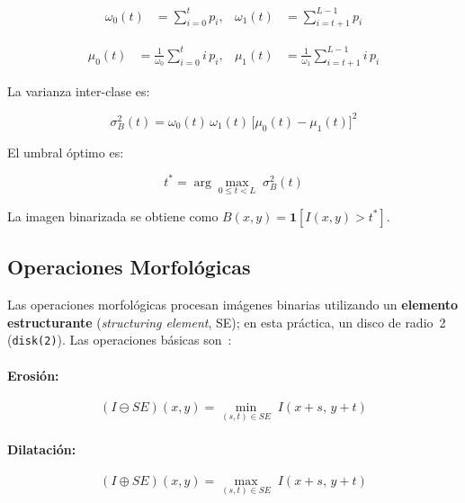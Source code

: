 \documentclass[12pt,a4paper]{article}
\begin{document}
\begin{align}
	\omega_0(t) & = \sum_{i=0}^{t} p_i,    &
	\omega_1(t) & = \sum_{i=t+1}^{L-1} p_i
	\label{eq:otsu_omega}
\end{align}

\begin{align}
	\mu_0(t) & = \frac{1}{\omega_0}\sum_{i=0}^{t} i\,p_i,    &
	\mu_1(t) & = \frac{1}{\omega_1}\sum_{i=t+1}^{L-1} i\,p_i
	\label{eq:otsu_mu}
\end{align}

La varianza inter-clase es:

\begin{equation}
	\sigma_B^2(t) = \omega_0(t)\,\omega_1(t)\,
	\bigl[\mu_0(t) - \mu_1(t)\bigr]^2
	\label{eq:otsu_sigma}
\end{equation}

El umbral óptimo es:

\begin{equation}
	\boxed{t^* = \arg\max_{0 \le t < L}\;\sigma_B^2(t)}
	\label{eq:otsu_opt}
\end{equation}

La imagen binarizada se obtiene como
$B(x,y) = \mathbf{1}[I(x,y) > t^*]$.

\subsection{Operaciones Morfológicas}
\label{subsec:morfologia}

Las operaciones morfológicas procesan imágenes binarias utilizando un
\textbf{elemento estructurante} (\emph{structuring element}, SE); en
esta práctica, un disco de radio~2 (\texttt{disk(2)}).  Las operaciones
básicas son~\cite{soille2004}:

\paragraph{Erosión:}
\begin{equation}
	(I \ominus SE)(x,y)
	= \min_{(s,t)\in SE}\; I(x+s,\,y+t)
	\label{eq:erosion}
\end{equation}

\paragraph{Dilatación:}
\begin{equation}
	(I \oplus SE)(x,y)
	= \max_{(s,t)\in SE}\; I(x+s,\,y+t)
	\label{eq:dilatacion}
\end{equation}
\end{document}
